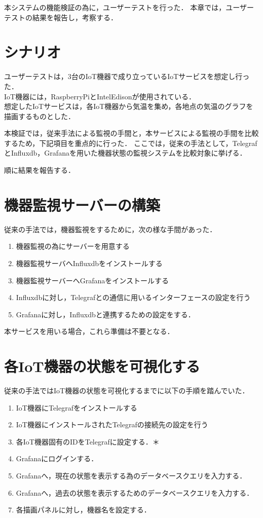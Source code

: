 本システムの機能検証の為に，ユーザーテストを行った．
本章では，ユーザーテストの結果を報告し，考察する．

\section{シナリオ}
ユーザーテストは，3台のIoT機器で成り立っているIoTサービスを想定し行った．\\
IoT機器には，RaspberryPiとIntelEdisonが使用されている．\\
想定したIoTサービスは，各IoT機器から気温を集め，各地点の気温のグラフを描画するものとした．

本検証では，従来手法による監視の手間と，本サービスによる監視の手間を比較するため，下記項目を重点的に行った．
ここでは，従来の手法として，TelegrafとInfluxdb，Grafanaを用いた機器状態の監視システムを比較対象に挙げる．

順に結果を報告する．
\section{機器監視サーバーの構築}
従来の手法では，機器監視をするために，次の様な手間があった．
\begin{enumerate}
\item 機器監視の為にサーバーを用意する
\item 機器監視サーバへInfluxdbをインストールする
\item 機器監視サーバーへGrafanaをインストールする
\item Influxdbに対し，Telegrafとの通信に用いるインターフェースの設定を行う
\item Grafanaに対し，Influxdbと連携するための設定をする．
\end{enumerate}

本サービスを用いる場合，これら準備は不要となる．

\section{各IoT機器の状態を可視化する}
従来の手法ではIoT機器の状態を可視化するまでに以下の手順を踏んでいた．
\begin{enumerate}
\item IoT機器にTelegrafをインストールする
\item IoT機器にインストールされたTelegrafの接続先の設定を行う
\item 各IoT機器固有のIDをTelegrafに設定する．＊
\item Grafanaにログインする．
\item Grafanaへ，現在の状態を表示する為のデータベースクエリを入力する．
\item Grafanaへ，過去の状態を表示するためのデータベースクエリを入力する．
\item 各描画パネルに対し，機器名を設定する．
\end{enumerate}

